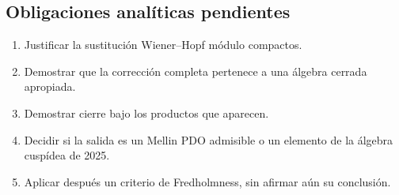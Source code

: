 \subsection*{Obligaciones analíticas pendientes}
\begin{enumerate}
\item Justificar la sustitución Wiener--Hopf módulo compactos.
\item Demostrar que la corrección completa pertenece a una álgebra cerrada apropiada.
\item Demostrar cierre bajo los productos que aparecen.
\item Decidir si la salida es un Mellin PDO admisible o un elemento de la álgebra cuspídea de 2025.
\item Aplicar después un criterio de Fredholmness, sin afirmar aún su conclusión.
\end{enumerate}
